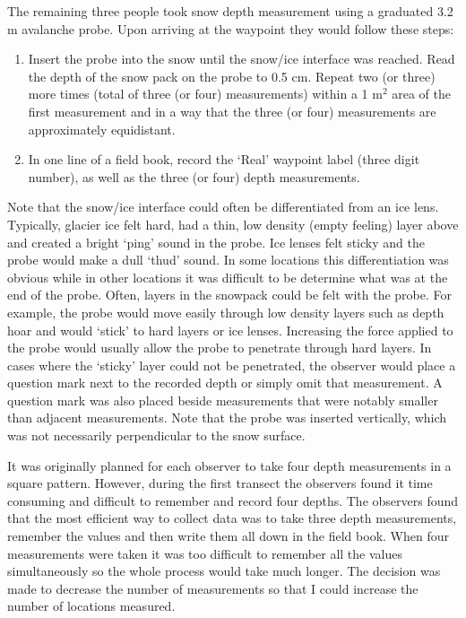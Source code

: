 \documentclass{sfuthesis}
\begin{document}
The remaining three people took snow depth measurement using a graduated 3.2 m avalanche probe. Upon arriving at the waypoint they would follow these steps:
\begin{enumerate}
\item Insert the probe into the snow until the snow/ice interface was reached. Read the depth of the snow pack on the probe to 0.5 cm. Repeat two (or three) more times (total of three (or four) measurements) within a 1 m$^2$ area of the first measurement and in a way that the three (or four) measurements are approximately equidistant. 
\item In one line of a field book, record the `Real' waypoint label (three digit number), as well as the three (or four) depth measurements. 
\end{enumerate}
Note that the snow/ice interface could often be differentiated from an ice lens. Typically, glacier ice felt hard, had a thin, low density (empty feeling) layer above and created a bright `ping' sound in the probe. Ice lenses felt sticky and the probe would make a dull `thud' sound. In some locations this differentiation was obvious while in other locations it was difficult to be determine what was at the end of the probe. Often, layers in the snowpack could be felt with the probe. For example, the probe would move easily through low density layers such as depth hoar and would `stick' to hard layers or ice lenses. Increasing the force applied to the probe would usually allow the probe to penetrate through hard layers. In cases where the `sticky' layer could not be penetrated, the observer would place a question mark next to the recorded depth or simply omit that measurement. A question mark was also placed beside measurements that were notably smaller than adjacent measurements. Note that the probe was inserted vertically, which was not necessarily perpendicular to the snow surface.

It was originally planned for each observer to take four depth measurements in a square pattern. However, during the first transect the observers found it time consuming and difficult to remember and record four depths. The observers found that the most efficient way to collect data was to take three depth measurements, remember the values and then write them all down in the field book. When four measurements were taken it was too difficult to remember all the values simultaneously so the whole process would take much longer. The decision was made to decrease the number of measurements so that I could increase the number of locations measured. 
\end{document}
